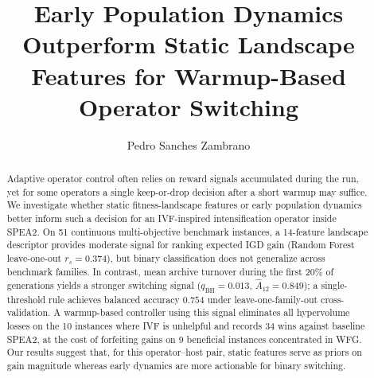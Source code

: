 \documentclass[runningheads]{llncs}
\begin{document}
\title{Early Population Dynamics Outperform Static Landscape Features for Warmup-Based Operator Switching}


\author{Pedro Sanches Zambrano}



\maketitle

\begin{abstract}
	Adaptive operator control often relies on reward signals accumulated
	during the run, yet for some operators a single keep-or-drop decision
	after a short warmup may suffice. We investigate whether static
	fitness-landscape features or early population dynamics better inform
	such a decision for an IVF-inspired intensification operator inside
	SPEA2. On 51 continuous multi-objective benchmark instances, a
	14-feature landscape descriptor provides moderate signal for ranking
	expected IGD gain (Random Forest leave-one-out $r_s\!=\!0.374$), but
	binary classification does not generalize across benchmark families.
	In contrast, mean archive turnover during the first 20\% of generations
	yields a stronger switching signal ($q_{\mathrm{BH}}\!=\!0.013$,
	$\hat{A}_{12}\!=\!0.849$); a single-threshold rule achieves balanced
	accuracy $0.754$ under leave-one-family-out cross-validation. A
	warmup-based controller using this signal eliminates all hypervolume
	losses on the 10 instances where IVF is unhelpful and records 34
	wins against baseline SPEA2, at the cost of forfeiting gains on
	9 beneficial instances concentrated in WFG.
	Our results suggest that, for this operator--host pair, static
	features serve as priors on gain magnitude whereas early dynamics are
	more actionable for binary switching.

\end{abstract}

\end{document}
